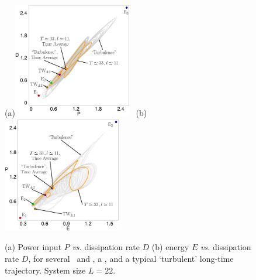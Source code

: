 

\begin{figure}[t]
\begin{center}
(a)\!\!\!\!\includegraphics[width=0.46\textwidth]{figs/energyBalance_pst.eps}%
~(b)\!\!\!\!\includegraphics[width=0.46\textwidth]{figs/equivaEP_pst.eps}
\end{center}
\caption{
(a) Power input $P$ {\em vs.}
dissipation rate $D$
(b) energy $E$  {\em vs.}
dissipation rate $D$,   for several  \eqva\ and \reqva,
a \rpo , and a typical `turbulent' long-time trajectory.
System size $L=22$.
        }
\label{f:drivedrag}
\end{figure}

